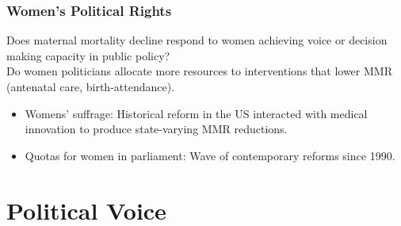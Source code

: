 \documentclass[9pt,letterpaper,subeqn]{beamer}
\begin{document}
\begin{frame}
\frametitle{Women's Political Rights}
Does maternal mortality decline respond to women achieving voice or decision making capacity in public policy?  \\
Do women politicians allocate more resources to interventions that lower MMR (antenatal care, birth-attendance).
\vspace{4.5mm}
\begin{itemize}
  \setlength{\itemsep}{9.5pt}
	\item Womens' suffrage: Historical reform in the US interacted with medical innovation to produce state-varying MMR reductions.
  \item Quotas for women in parliament: Wave of contemporary reforms since 1990.
\end{itemize}
\end{frame}


\section{Political Voice}
\end{document}
